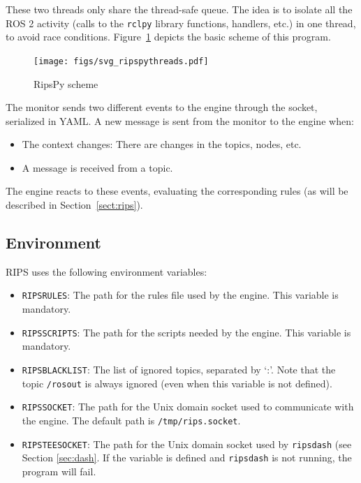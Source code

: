 \documentclass[a4paper]{article}
\begin{document}
These two threads only share the thread-safe queue.
The idea is to isolate all the ROS 2 activity (calls to the \texttt{rclpy}
library functions, handlers, etc.) in one thread, to avoid
race conditions. Figure~\ref{fig:threads} depicts the basic scheme of
this program.

\begin{figure}[t!]
\begin{center}
\texttt{[image: figs/svg\_ripspythreads.pdf]}
\caption{RipsPy scheme \label{fig:threads}}
\end{center}
\end{figure}

The monitor sends two different events to the engine through the
socket, serialized in YAML. A new message is sent
from the monitor to the engine when:

\begin{itemize}
	\item The context changes: There are changes in the topics,
	nodes, etc.

	\item A message is received from a topic.
\end{itemize}

The engine reacts to these events, evaluating the corresponding
rules (as will be described in Section~\ref{sect:rips}).

\subsection{Environment \label{sec:env}}

RIPS uses the following environment variables:

\begin{itemize}
	\item \texttt{RIPSRULES}: The path for the rules file used by
		the engine. This variable is mandatory.

	\item \texttt{RIPSSCRIPTS}: The path for the scripts needed by
		the engine. This variable is mandatory.

	\item \texttt{RIPSBLACKLIST}: The list of ignored topics,
	separated by `:'. Note that the topic
	\texttt{/rosout} is always ignored (even when this variable
	is not defined).

	\item \texttt{RIPSSOCKET}: The path for the Unix domain socket
		used to communicate with the engine.
		The default path is \texttt{/tmp/rips.socket}.

	\item \texttt{RIPSTEESOCKET}: The path for the Unix domain socket
		used by \texttt{ripsdash} (see Section \ref{sec:dash}. If
		the variable is defined and \texttt{ripsdash} is not running,
		the program will fail.
\end{itemize}
\end{document}
